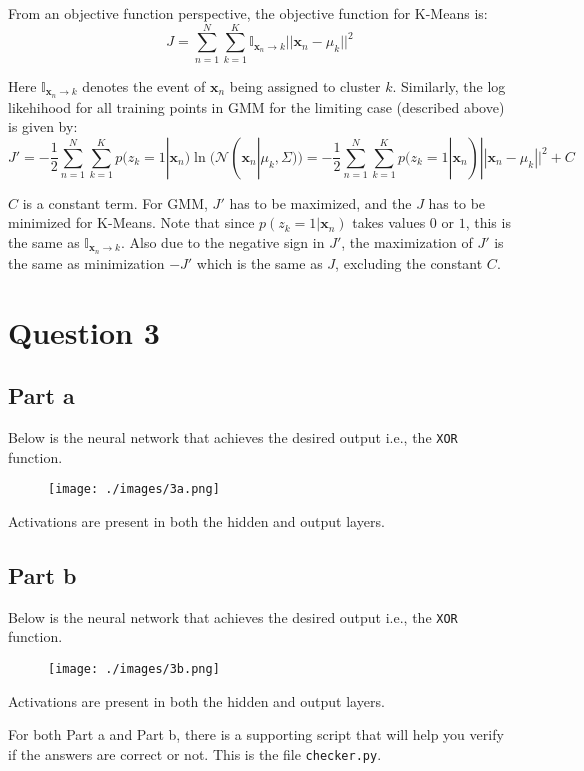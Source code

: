 \documentclass{article}
\newcommand{\xbold}{\mathbf{x}}
\newcommand{\ind}{\mathbb{I}}
\begin{document}
\begin{flushleft}
From an objective function perspective, the objective function for K-Means is:
\begin{equation}
J = \sum_{n=1}^{N} \sum_{k=1}^{K} \ind_{\xbold_{n} \rightarrow k} ||\xbold_{n} - \mu_{k}||^{2}
\end{equation}

Here \(\ind_{\xbold_{n} \rightarrow k}\) denotes the event of \(\xbold_{n}\) being assigned to cluster \(k\). Similarly, the log likehihood for all training points in GMM for the limiting case (described above) is given by:
\begin{equation}
J' = -\frac{1}{2}\sum_{n=1}^{N} \sum_{k=1}^{K} p(z_{k} = 1 | \xbold_{n}) \ln(\mathcal{N}(\xbold_{n}|\mu_{k}, \Sigma)) = -\frac{1}{2}\sum_{n=1}^{N} \sum_{k=1}^{K} p(z_{k} = 1 | \xbold_{n}) ||\xbold_{n} - \mu_{k}||^{2} + C
\end{equation}

\(C\) is a constant term. For GMM, \(J'\) has to be maximized, and the \(J\) has to be minimized for K-Means. Note that since \(p(z_{k} = 1 | \xbold_{n})\) takes values \(0\) or \(1\), this is the same as \(\ind_{\xbold_{n} \rightarrow k}\). Also due to the negative sign in \(J'\), the maximization of \(J'\) is the same as minimization \(-J'\) which is the same as \(J\), excluding the constant \(C\).
\end{flushleft}
\section*{Question 3}

\subsection*{Part a}
\begin{flushleft}
Below is the neural network that achieves the desired output i.e., the \texttt{XOR} function. 
\begin{figure}[H]
\centering
\texttt{[image: ./images/3a.png]}
\end{figure}
Activations are present in both the hidden and output layers.
\end{flushleft}

\subsection*{Part b}
\begin{flushleft}
Below is the neural network that achieves the desired output i.e., the \texttt{XOR} function.
\begin{figure}[H]
\centering
\texttt{[image: ./images/3b.png]}
\end{figure}
Activations are present in both the hidden and output layers.

For both Part a and Part b, there is a supporting script that will help you verify if the answers are correct or not. This is the file \texttt{checker.py}.
\end{flushleft}
\end{document}
